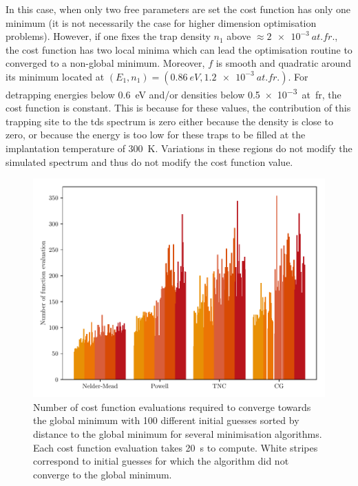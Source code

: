 In this case, when only two free parameters are set the cost function has only one minimum (it is not necessarily the case for higher dimension optimisation problems).
However, if one fixes the trap density $n_1$ above $\approx \SI{2e-3}{at.fr.}$, the cost function has two local minima which can lead the optimisation routine to converged to a non-global minimum.
Moreover, $f$ is smooth and quadratic around its minimum located at $(E_1, n_1) = (\SI{0.86}{eV}, \SI{1.2e-3}{at.fr.})$.
For detrapping energies below \SI{0.6}{eV} and/or densities below \SI{0.5e-3}{at.fr}, the cost function is constant.
This is because for these values, the contribution of this trapping site to the \gls{tds} spectrum is zero either because the density is close to zero, or because the energy is too low for these traps to be filled at the implantation temperature of \SI{300}{K}.
Variations in these regions do not modify the simulated spectrum and thus do not modify the cost function value.

\begin{figure} [ht]
    \centering
    \includegraphics[width=\linewidth]{Figures/Chapter3/Parametric_optimisation/algorithms_perfs.pdf}
    \caption{Number of cost function evaluations required to converge towards the global minimum with 100 different initial guesses sorted by distance to the global minimum for several minimisation algorithms. Each cost function evaluation takes \SI{20}{s} to compute. White stripes correspond to initial guesses for which the algorithm did not converge to the global minimum.}
    \label{fig:algos perfs}
\end{figure}


